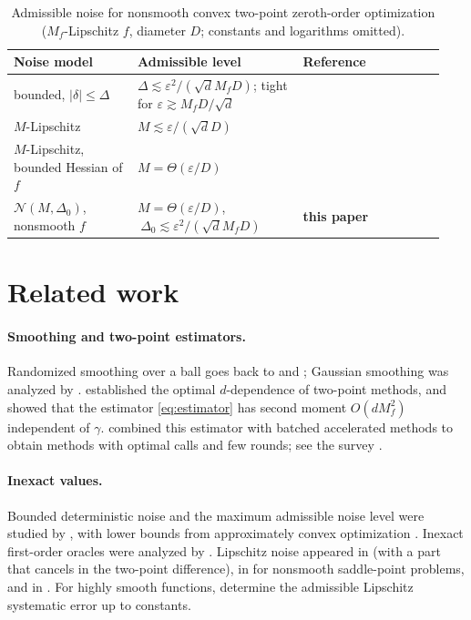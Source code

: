 \documentclass{article} %
\renewcommand{\eps}{\varepsilon}
\newcommand{\cN}{\mathcal{N}}
\theoremstyle{plain}
\theoremstyle{definition}
\theoremstyle{remark}
\begin{document}
\begin{table}[t]
\caption{Admissible noise for nonsmooth convex two-point zeroth-order optimization ($M_f$-Lipschitz $f$, diameter $D$; constants and logarithms omitted).}
\label{tab:comparison}
\centering\small
\begin{tabular}{@{}p{0.27\linewidth}p{0.36\linewidth}p{0.31\linewidth}@{}}
\toprule
Noise model & Admissible level & Reference \\
\midrule
bounded, $|\delta|\le\Delta$ & $\Delta\lesssim\eps^2/(\sqrt dM_fD)$; tight for $\eps\gtrsim M_fD/\sqrt d$ & \citet{gasnikov2022power,risteski2016algorithms,pasechnyuk2023upper}\\
$M$-Lipschitz & $M\lesssim\eps/(\sqrt dD)$ & \citet{dvinskikh2022noisy,lobanov2024improved}\\
$M$-Lipschitz, bounded Hessian of $f$ & $M=\Theta(\eps/D)$ & \citet{loginov2026minimax}\\
\midrule
$\cN(M,\Delta_0)$, nonsmooth $f$ & $M=\Theta(\eps/D)$, $\ \Delta_0\lesssim\eps^2/(\sqrt dM_fD)$ & \textbf{this paper}\\
\bottomrule
\end{tabular}
\end{table}

\section{Related work}\label{sec:related}

\paragraph{Smoothing and two-point estimators.} Randomized smoothing over a ball goes back to \citet{nemirovsky1983problem} and \citet{flaxman2005online}; Gaussian smoothing was analyzed by \citet{nesterov2017random}. \citet{duchi2015optimal} established the optimal $d$-dependence of two-point methods, and \citet{shamir2017optimal} showed that the estimator \eqref{eq:estimator} has second moment $O(dM_f^2)$ independent of $\gamma$. \citet{gasnikov2022power} combined this estimator with batched accelerated methods \citep{lan2012optimal} to obtain methods with optimal calls and few rounds; see the survey \citet{gasnikov2022survey}.

\paragraph{Inexact values.} Bounded deterministic noise and the maximum admissible noise level were studied by \citet{bayandina2018gradient,gasnikov2022power,pasechnyuk2023upper}, with lower bounds from approximately convex optimization \citep{risteski2016algorithms}. Inexact first-order oracles were analyzed by \citet{devolder2014first}. Lipschitz noise appeared in \citet{gasnikov2016inexact} (with a part that cancels in the two-point difference), in \citet{dvinskikh2022noisy} for nonsmooth saddle-point problems, and in \citet{lobanov2024improved}. For highly smooth functions, \citet{loginov2026minimax} determine the admissible Lipschitz systematic error up to constants.
\end{document}
